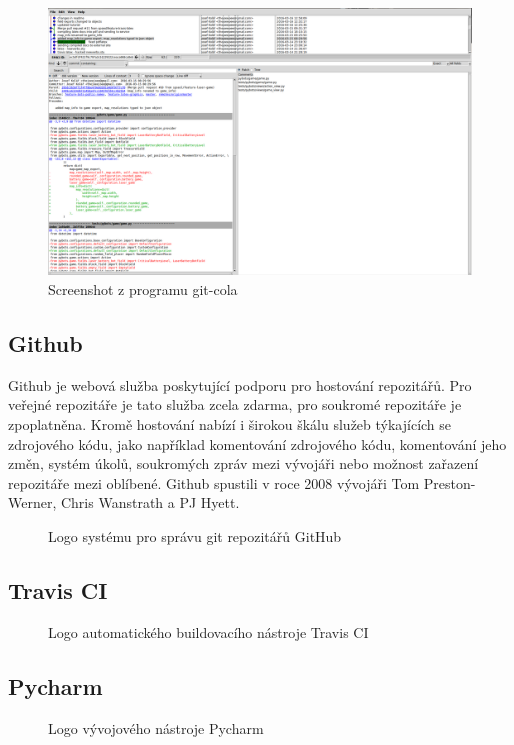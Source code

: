 \begin{figure}[bht]
 \centering
 \includegraphics[width=\textwidth]{assets/git-cola-screenshot}
 \caption{Screenshot z programu git-cola}
\end{figure}

\subsection{Github}

Github je webová služba poskytující podporu pro hostování  repozitářů. Pro veřejné repozitáře je tato služba zcela zdarma, pro soukromé repozitáře je zpoplatněna. Kromě hostování nabízí i širokou škálu služeb týkajících se zdrojového kódu, jako například komentování zdrojového k\'{o}du, komentování jeho změn, systém úkolů, soukromých zpráv mezi vývojáři nebo možnost zařazení repozitáře mezi oblíbené. Github spustili v roce 2008 vývojáři Tom Preston-Werner, Chris Wanstrath a PJ Hyett.

\begin{figure}[bht]
 \centering
 
 \caption{Logo systému pro správu git repozitářů GitHub}
\end{figure}

\subsection{Travis CI}

\begin{figure}[bht]
 \centering
 
 \caption{Logo automatického buildovacího nástroje Travis CI}
\end{figure}


\subsection{Pycharm}

\begin{figure}[bht]
 \centering
 
 \caption{Logo vývojového nástroje Pycharm}
\end{figure}

